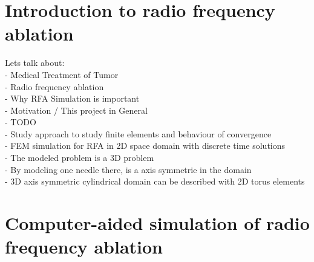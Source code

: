 \documentclass[parskip=half, titlepage=yes, 12pt, BCOR=12mm, DIV=calc]{scrartcl}
\begin{document}
\maketitle
\tableofcontents

\clearpage




\section{Introduction to radio frequency ablation}
Lets talk about:\\
- Medical Treatment of Tumor\\
- Radio frequency ablation\\
- Why RFA Simulation is important \\
- Motivation / This project in General\\

- TODO \\


- Study approach to study finite elements and behaviour of convergence \\
- FEM simulation for RFA in 2D space domain with discrete time solutions \\
- The modeled problem is a 3D problem \\
- By modeling one needle there, is a axis symmetrie in the domain \\
- 3D axis symmetric cylindrical domain can be described with 2D torus elements \\ 



\section{Computer-aided simulation of radio frequency ablation}
\end{document}
